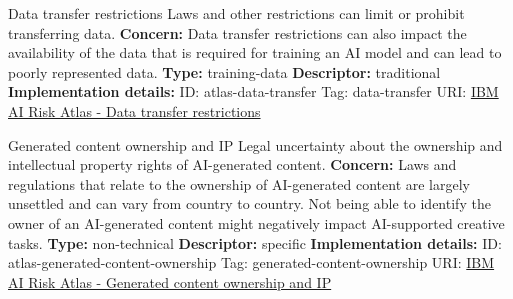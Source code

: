 \documentclass[a4paper,12pt]{article}
\begin{document}
\begin{definitionbox}{Data transfer restrictions}
Laws and other restrictions can limit or prohibit transferring data.\newline\newline
\textbf{Concern: }Data transfer restrictions can also impact the availability of the data that is required for training an AI model and can lead to poorly represented data.\newline\newline
\textbf{Type: }training-data\newline
\textbf{Descriptor: }traditional \newline\newline
\textbf{Implementation details: } \newline
ID: atlas-data-transfer \newline
Tag: data-transfer \newline
URI:  \href{https://www.ibm.com/docs/en/watsonx/saas?topic=SSYOK8/wsj/ai-risk-atlas/data-transfer.html}{IBM AI Risk Atlas - Data transfer restrictions}\newline
\end{definitionbox}
\begin{definitionbox}{Generated content ownership and IP}
Legal uncertainty about the ownership and intellectual property rights of AI-generated content.\newline\newline
\textbf{Concern: }Laws and regulations that relate to the ownership of AI-generated content are largely unsettled and can vary from country to country. Not being able to identify the owner of an AI-generated content might negatively impact AI-supported creative tasks.\newline\newline
\textbf{Type: }non-technical\newline
\textbf{Descriptor: }specific \newline\newline
\textbf{Implementation details: } \newline
ID: atlas-generated-content-ownership \newline
Tag: generated-content-ownership \newline
URI:  \href{https://www.ibm.com/docs/en/watsonx/saas?topic=SSYOK8/wsj/ai-risk-atlas/generated-content-ownership.html}{IBM AI Risk Atlas - Generated content ownership and IP}\newline
\end{definitionbox}
\end{document}
